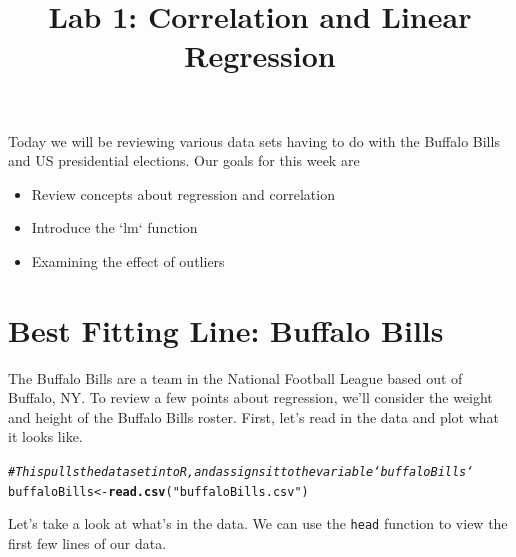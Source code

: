 \documentclass{article}\usepackage[]{graphicx}\usepackage[]{color}
\title{Lab 1: Correlation and Linear Regression}
\author{}
\makeatletter
\newcommand{\hlstr}[1]{\textcolor[rgb]{0.192,0.494,0.8}{#1}}%
\newcommand{\hlcom}[1]{\textcolor[rgb]{0.678,0.584,0.686}{\textit{#1}}}%
\newcommand{\hlstd}[1]{\textcolor[rgb]{0.345,0.345,0.345}{#1}}%
\newcommand{\hlkwb}[1]{\textcolor[rgb]{0.69,0.353,0.396}{#1}}%
\newcommand{\hlkwd}[1]{\textcolor[rgb]{0.737,0.353,0.396}{\textbf{#1}}}%
\newenvironment{kframe}{%
 \def\at@end@of@kframe{}%
 \ifinner\ifhmode%
  \def\at@end@of@kframe{\end{minipage}}%
  \begin{minipage}{\columnwidth}%
 \fi\fi%
 \def\FrameCommand##1{\hskip\@totalleftmargin \hskip-\fboxsep
 \colorbox{shadecolor}{##1}\hskip-\fboxsep
     \hskip-\linewidth \hskip-\@totalleftmargin \hskip\columnwidth}%
 \MakeFramed {\advance\hsize-\width
   \@totalleftmargin\z@ \linewidth\hsize
   \@setminipage}}%
 {\par\unskip\endMakeFramed%
 \at@end@of@kframe}
\newenvironment{knitrout}{}{} %
\makeatother
\begin{document}
\maketitle  

Today we will be reviewing various data sets having to do with the Buffalo Bills and US presidential elections. Our goals for this week are

\begin{itemize}
\item Review concepts about regression and correlation
\item Introduce the `lm` function
\item Examining the effect of outliers
\end{itemize}

\section{Best Fitting Line: Buffalo Bills}

The Buffalo Bills are a team in the National Football League based out of Buffalo, NY. To review a few points about regression, we'll consider the weight and height of the Buffalo Bills roster. First, let's read in the data and plot what it looks like.


\begin{knitrout}
\color{fgcolor}\begin{kframe}
\begin{alltt}
\hlcom{# This pulls the data set into R, and assigns it to the variable `buffaloBills`}
\hlstd{buffaloBills} \hlkwb{<-} \hlkwd{read.csv}\hlstd{(}\hlstr{"buffaloBills.csv"}\hlstd{)}
\end{alltt}
\end{kframe}
\end{knitrout}

Let's take a look at what's in the data. We can use the \texttt{head} function to view the first few lines of our data. 
\end{document}

